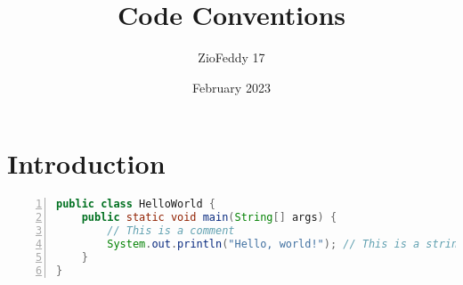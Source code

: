 \documentclass{article}
\title{Code Conventions}
\author{ZioFeddy 17}
\date{February 2023}
\begin{document}
\maketitle

\section{Introduction}
\begin{lstlisting}[language=Java, numbers=left]
public class HelloWorld {
    public static void main(String[] args) {
        // This is a comment
        System.out.println("Hello, world!"); // This is a string
    }
}
\end{lstlisting}
\end{document}
